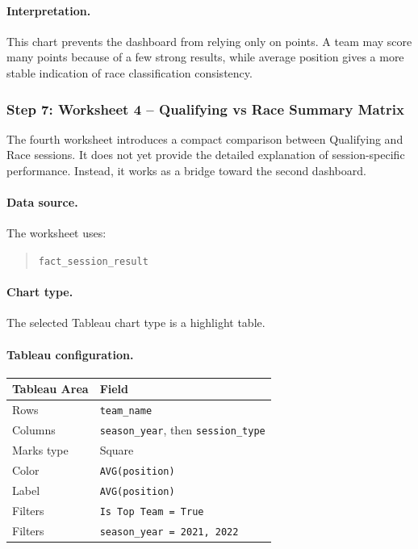 \documentclass[12pt,a4paper]{article}
\begin{document}
	\paragraph{Interpretation.}
	This chart prevents the dashboard from relying only on points.
	A team may score many points because of a few strong results, while average position gives a more stable indication of race classification consistency.
	
	\subsubsection{Step 7: Worksheet 4 -- Qualifying vs Race Summary Matrix}
	
	The fourth worksheet introduces a compact comparison between Qualifying and Race sessions.
	It does not yet provide the detailed explanation of session-specific performance.
	Instead, it works as a bridge toward the second dashboard.
	
	\paragraph{Data source.}
	The worksheet uses:
	
	\begin{quote}
		\texttt{fact\_session\_result}
	\end{quote}
	
	\paragraph{Chart type.}
	The selected Tableau chart type is a highlight table.
	
	\paragraph{Tableau configuration.}
	
	\begin{longtable}{p{5cm} p{8cm}}
		\toprule
		\textbf{Tableau Area} & \textbf{Field} \\
		\midrule
		Rows & \texttt{team\_name} \\
		Columns & \texttt{season\_year}, then \texttt{session\_type} \\
		Marks type & Square \\
		Color & \texttt{AVG(position)} \\
		Label & \texttt{AVG(position)} \\
		Filters & \texttt{Is Top Team = True} \\
		Filters & \texttt{season\_year = 2021, 2022} \\
		\bottomrule
	\end{longtable}
	
\end{document}
